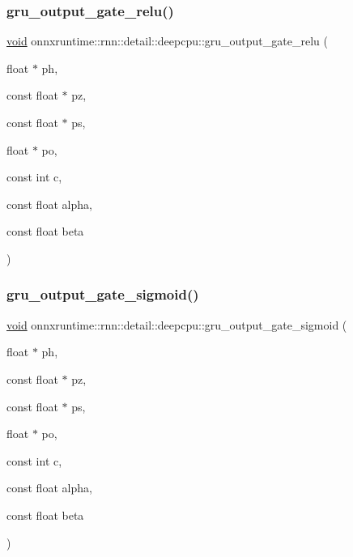 \mbox{\label{namespaceonnxruntime_1_1rnn_1_1detail_1_1deepcpu_a020e1f61b777f9731726419e8cc6057d}} 
\subsubsection{\texorpdfstring{gru\+\_\+output\+\_\+gate\+\_\+relu()}{gru\_output\_gate\_relu()}}
{\footnotesize\ttfamily \mbox{\hyperlink{mlasi_8h_a88f941d423cb2a819b70a1358982b1a6}{void}} onnxruntime\+::rnn\+::detail\+::deepcpu\+::gru\+\_\+output\+\_\+gate\+\_\+relu (\begin{DoxyParamCaption}\item[{float $\ast$}]{ph,  }\item[{const float $\ast$}]{pz,  }\item[{const float $\ast$}]{ps,  }\item[{float $\ast$}]{po,  }\item[{const int}]{c,  }\item[{const float}]{alpha,  }\item[{const float}]{beta }\end{DoxyParamCaption})}

\mbox{\label{namespaceonnxruntime_1_1rnn_1_1detail_1_1deepcpu_a7d9cf1331cc4a7af8a2e3d65165ea56c}} 
\subsubsection{\texorpdfstring{gru\+\_\+output\+\_\+gate\+\_\+sigmoid()}{gru\_output\_gate\_sigmoid()}}
{\footnotesize\ttfamily \mbox{\hyperlink{mlasi_8h_a88f941d423cb2a819b70a1358982b1a6}{void}} onnxruntime\+::rnn\+::detail\+::deepcpu\+::gru\+\_\+output\+\_\+gate\+\_\+sigmoid (\begin{DoxyParamCaption}\item[{float $\ast$}]{ph,  }\item[{const float $\ast$}]{pz,  }\item[{const float $\ast$}]{ps,  }\item[{float $\ast$}]{po,  }\item[{const int}]{c,  }\item[{const float}]{alpha,  }\item[{const float}]{beta }\end{DoxyParamCaption})}

